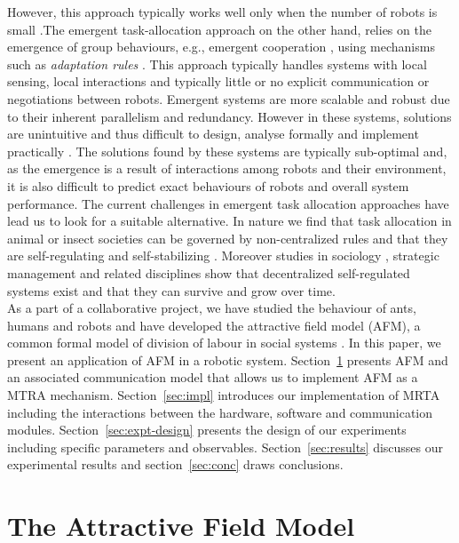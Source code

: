However, this approach typically works well only when the number of robots is small \cite{Lerman+2006}.The emergent task-allocation approach on the other hand, relies on the emergence of group behaviours, e.g., emergent cooperation \cite{Lerman+2006}, using mechanisms such as {\em adaptation rules} \cite{Liu+2007}. This approach typically handles systems with local sensing, local interactions and typically little or no explicit communication or negotiations between robots.
Emergent systems are more scalable and robust due to their inherent parallelism and redundancy.
However in these systems, solutions are unintuitive and thus difficult to design, analyse formally and implement practically \cite{Gerkey+2004,Lerman+2006}.
The solutions found by these systems are typically sub-optimal and, as the emergence is a result of interactions among robots and their environment, it is also difficult to predict exact behaviours of robots and overall system performance.
The current challenges in emergent task allocation approaches have lead us to look for a suitable alternative.
In nature we find that task allocation in animal or insect societies can be governed by non-centralized rules and that they are self-regulating and self-stabilizing \cite{Bonabeau+1999}.  Moreover studies in sociology \cite{Sayer+1992}, strategic management \cite{Kogut2000} and related disciplines show that decentralized self-regulated systems exist and that they can survive and grow over time.\\
As a part of a collaborative project, we have studied the behaviour of ants, humans and robots and have developed the attractive field model (AFM), a common formal model of division of labour in social systems \cite{Elsa}.
In this paper, we present an application of AFM in a robotic system.
Section~\ref{sec:model} presents AFM and an associated communication model that allows us to implement AFM as a MTRA mechanism.
Section~\ref{sec:impl} introduces our implementation of MRTA including the interactions between the hardware, software and communication modules.
Section~\ref{sec:expt-design} presents the design of our experiments including specific parameters and observables.
Section~\ref{sec:results} discusses our experimental results and section~\ref{sec:conc} draws conclusions.
\section{The Attractive Field Model}
\label{sec:model}
